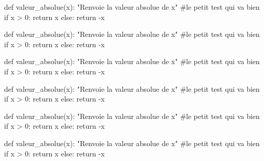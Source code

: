 \documentclass[french,a4paper,10pt]{article}
\begin{document}
\pagebreak

{\small \begin{codehigh}
\begin{CodePythontexAlt}[Largeur=10cm]{}
def valeur_absolue(x):
    "Renvoie la valeur absolue de x"
    #le petit test qui va bien
    if x > 0:
        return x
    else:
    return -x
\end{CodePythontexAlt}
\end{codehigh}}

\begin{CodePythontexAlt}[Largeur=10cm]{}
def valeur_absolue(x):
	"Renvoie la valeur absolue de x"
	#le petit test qui va bien
	if x > 0:
		return x
	else:
		return -x
\end{CodePythontexAlt}

{\small \begin{codehigh}
\begin{CodePythontexAlt}[Largeur=0.5\linewidth,Centre,Lignes=false]{}
def valeur_absolue(x):
    "Renvoie la valeur absolue de x"
    #le petit test qui va bien
    if x > 0:
        return x
    else:
    return -x
\end{CodePythontexAlt}
\end{codehigh}}

\begin{CodePythontexAlt}[Largeur=0.5\linewidth,Centre,Lignes=false]{}
def valeur_absolue(x):
	"Renvoie la valeur absolue de x"
	#le petit test qui va bien
	if x > 0:
		return x
	else:
		return -x
\end{CodePythontexAlt}

{\small \begin{codehigh}
\begin{CodePythontex}[Largeur=11cm,Lignes=false]{}
def valeur_absolue(x):
    "Renvoie la valeur absolue de x"
    #le petit test qui va bien
    if x > 0:
        return x
    else:
    return -x
\end{CodePythontex}
\end{codehigh}}

\begin{CodePythontex}[Largeur=11cm,Lignes=false]{}
def valeur_absolue(x):
	"Renvoie la valeur absolue de x"
	#le petit test qui va bien
	if x > 0:
		return x
	else:
		return -x
\end{CodePythontex}

\pagebreak
\end{document}
